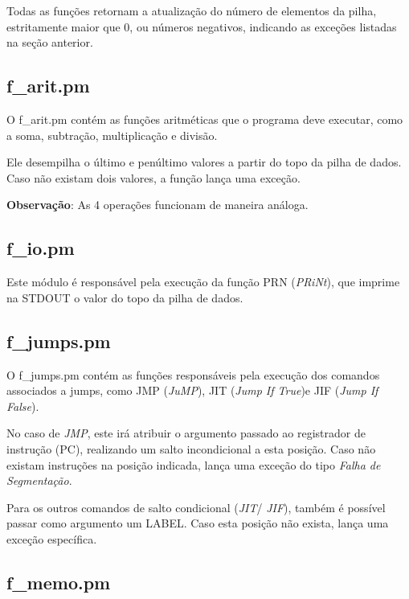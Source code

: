 \documentclass[a4paper]{article}
\begin{document}
        Todas as funções retornam a atualização do número de elementos
        da pilha, estritamente maior que 0, ou números negativos, 
        indicando as exceções listadas na seção anterior.

    \subsection{f\_arit.pm}
        
        O f\_arit.pm contém as funções aritméticas que o programa deve
        executar, como a soma, subtração, multiplicação e divisão.
        
        Ele desempilha o último e penúltimo valores a partir do topo 
        da pilha de dados. Caso não existam dois valores, a função 
        lança uma exceção.
        
        \textbf{Observação}: As 4 operações funcionam de maneira
        análoga.        
        
    \subsection{f\_io.pm}
        
        Este módulo é responsável pela execução da função PRN 
        (\emph{PRiNt}), que imprime na STDOUT o valor do topo da 
        pilha de dados.
            
    \subsection{f\_jumps.pm}
        
        O f\_jumps.pm contém as funções responsáveis pela execução dos
        comandos associados a jumps, como JMP (\emph{JuMP}), JIT 
        (\emph{Jump If True})e JIF (\emph{Jump If False}).
        
        No caso de \emph{JMP}, este irá atribuir o argumento passado 
        ao registrador de instrução (PC), realizando um salto 
        incondicional a esta posição. Caso não existam instruções
        na posição indicada, lança uma exceção do tipo \emph{Falha
        de Segmentação}.
        
        Para os outros comandos de salto condicional (\emph{JIT}/
        \emph{JIF}), também é possível passar como argumento um
        LABEL. Caso esta posição não exista, lança uma exceção
        específica.
    
    \subsection{f\_memo.pm}
        
\end{document}
